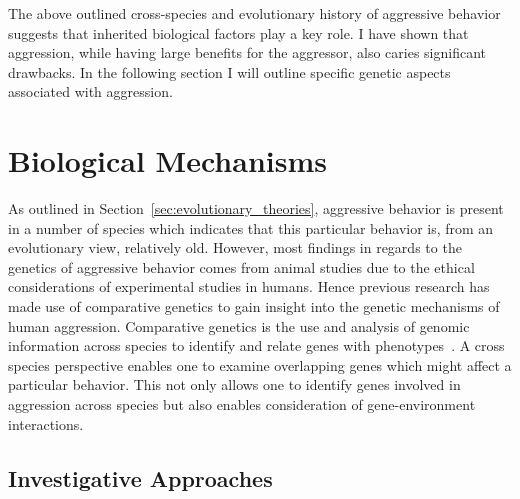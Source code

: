 The above outlined cross-species and evolutionary history of aggressive behavior suggests that inherited biological factors play a key role.
I have shown that aggression, while having large benefits for the aggressor, also caries significant drawbacks.
In the following section I will outline specific genetic aspects associated with aggression.


\section{Biological Mechanisms}
\label{sec:biological_mechanisms}

As outlined in Section~\ref{sec:evolutionary_theories}, aggressive behavior is present in a number of species which indicates that this particular behavior is, from an evolutionary view, relatively old.
However, most findings in regards to the genetics of aggressive behavior comes from animal studies due to the ethical considerations of experimental studies in humans.
Hence previous research has made use of comparative genetics to gain insight into the genetic mechanisms of human aggression.
Comparative genetics is the use and analysis of genomic information across species to identify and relate genes with phenotypes~\cite{Maxson2003}.
A cross species perspective enables one to examine overlapping genes which might affect a particular behavior.
This not only allows one to identify genes involved in aggression across species but also enables consideration of gene-environment interactions.

\subsection{Investigative Approaches}
\label{sub:investigation_approaches}

